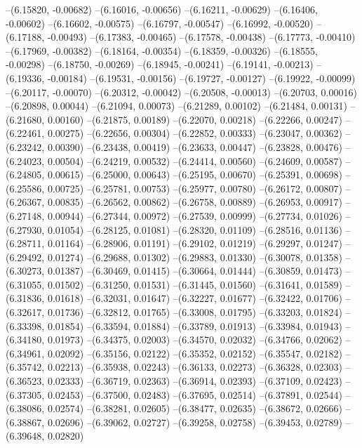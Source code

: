 --(6.15820, -0.00682)
--(6.16016, -0.00656)
--(6.16211, -0.00629)
--(6.16406, -0.00602)
--(6.16602, -0.00575)
--(6.16797, -0.00547)
--(6.16992, -0.00520)
--(6.17188, -0.00493)
--(6.17383, -0.00465)
--(6.17578, -0.00438)
--(6.17773, -0.00410)
--(6.17969, -0.00382)
--(6.18164, -0.00354)
--(6.18359, -0.00326)
--(6.18555, -0.00298)
--(6.18750, -0.00269)
--(6.18945, -0.00241)
--(6.19141, -0.00213)
--(6.19336, -0.00184)
--(6.19531, -0.00156)
--(6.19727, -0.00127)
--(6.19922, -0.00099)
--(6.20117, -0.00070)
--(6.20312, -0.00042)
--(6.20508, -0.00013)
--(6.20703, 0.00016)
--(6.20898, 0.00044)
--(6.21094, 0.00073)
--(6.21289, 0.00102)
--(6.21484, 0.00131)
--(6.21680, 0.00160)
--(6.21875, 0.00189)
--(6.22070, 0.00218)
--(6.22266, 0.00247)
--(6.22461, 0.00275)
--(6.22656, 0.00304)
--(6.22852, 0.00333)
--(6.23047, 0.00362)
--(6.23242, 0.00390)
--(6.23438, 0.00419)
--(6.23633, 0.00447)
--(6.23828, 0.00476)
--(6.24023, 0.00504)
--(6.24219, 0.00532)
--(6.24414, 0.00560)
--(6.24609, 0.00587)
--(6.24805, 0.00615)
--(6.25000, 0.00643)
--(6.25195, 0.00670)
--(6.25391, 0.00698)
--(6.25586, 0.00725)
--(6.25781, 0.00753)
--(6.25977, 0.00780)
--(6.26172, 0.00807)
--(6.26367, 0.00835)
--(6.26562, 0.00862)
--(6.26758, 0.00889)
--(6.26953, 0.00917)
--(6.27148, 0.00944)
--(6.27344, 0.00972)
--(6.27539, 0.00999)
--(6.27734, 0.01026)
--(6.27930, 0.01054)
--(6.28125, 0.01081)
--(6.28320, 0.01109)
--(6.28516, 0.01136)
--(6.28711, 0.01164)
--(6.28906, 0.01191)
--(6.29102, 0.01219)
--(6.29297, 0.01247)
--(6.29492, 0.01274)
--(6.29688, 0.01302)
--(6.29883, 0.01330)
--(6.30078, 0.01358)
--(6.30273, 0.01387)
--(6.30469, 0.01415)
--(6.30664, 0.01444)
--(6.30859, 0.01473)
--(6.31055, 0.01502)
--(6.31250, 0.01531)
--(6.31445, 0.01560)
--(6.31641, 0.01589)
--(6.31836, 0.01618)
--(6.32031, 0.01647)
--(6.32227, 0.01677)
--(6.32422, 0.01706)
--(6.32617, 0.01736)
--(6.32812, 0.01765)
--(6.33008, 0.01795)
--(6.33203, 0.01824)
--(6.33398, 0.01854)
--(6.33594, 0.01884)
--(6.33789, 0.01913)
--(6.33984, 0.01943)
--(6.34180, 0.01973)
--(6.34375, 0.02003)
--(6.34570, 0.02032)
--(6.34766, 0.02062)
--(6.34961, 0.02092)
--(6.35156, 0.02122)
--(6.35352, 0.02152)
--(6.35547, 0.02182)
--(6.35742, 0.02213)
--(6.35938, 0.02243)
--(6.36133, 0.02273)
--(6.36328, 0.02303)
--(6.36523, 0.02333)
--(6.36719, 0.02363)
--(6.36914, 0.02393)
--(6.37109, 0.02423)
--(6.37305, 0.02453)
--(6.37500, 0.02483)
--(6.37695, 0.02514)
--(6.37891, 0.02544)
--(6.38086, 0.02574)
--(6.38281, 0.02605)
--(6.38477, 0.02635)
--(6.38672, 0.02666)
--(6.38867, 0.02696)
--(6.39062, 0.02727)
--(6.39258, 0.02758)
--(6.39453, 0.02789)
--(6.39648, 0.02820)
